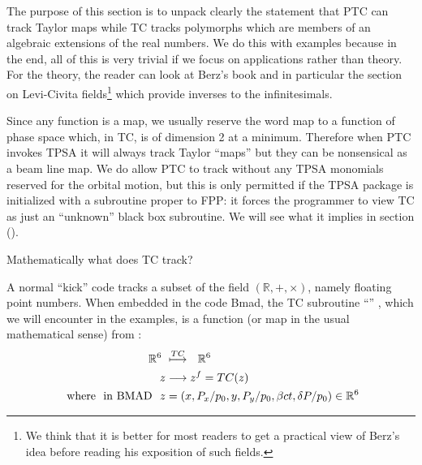 \documentclass{hitec}     %
\begin{document}
{{{The purpose of this section is to unpack clearly the statement that PTC can track Taylor maps while TC tracks polymorphs which are members of an algebraic extensions of the real numbers. We do this with examples because in the end, all of this is very trivial if we focus on applications rather than theory. For the theory, the reader can look at Berz's book \cite{theberzbook} and in particular  the section on Levi-Civita fields\footnote{We think that it is better for most readers to get a practical view of Berz's idea before reading his exposition of such fields.} which provide inverses to the infinitesimals.

Since any function is a map, we usually reserve the word map to a function of phase space which, in TC, is of dimension 2 at a minimum. Therefore when PTC invokes TPSA it will always track Taylor ``maps'' but they can be nonsensical as a beam line map. We do  allow PTC  to track without any TPSA monomials reserved for the orbital motion, but this is only  permitted if the TPSA package is initialized with a subroutine proper to FPP: it forces the programmer to view TC as  just  an ``unknown'' black box subroutine. We will see what it implies  in section ().


Mathematically what does TC track?

A normal ``kick'' code tracks a subset of the field $(\mathbb{R},+,\times)$, namely floating point numbers. When embedded in the code Bmad, the TC subroutine ``'' , which we will encounter in the examples, is a function (or map in the usual mathematical sense) from :
%
\begin{align} {{\mathbb{R}}}^{6}\ &\stackrel{TC}{\longmapsto}\ \ {{\mathbb{R}}}^{6} \\  z &\longrightarrow {z}^{f}=TC(z) \\~{\rm w}{\rm h}{\rm e}{\rm r}{\rm e}~~{\rm i}{\rm n}~{\rm B}{\rm M}{\rm A}{\rm D}~~z&=
\left({x,{P}_{x}/{p}_{0},y,{P}_{y}/{p}_{0},\beta ct,\delta P/{p}_{0}}\right)\in {{\mathbb{R}}}^{6}\end{align}


}}}
\end{document}
